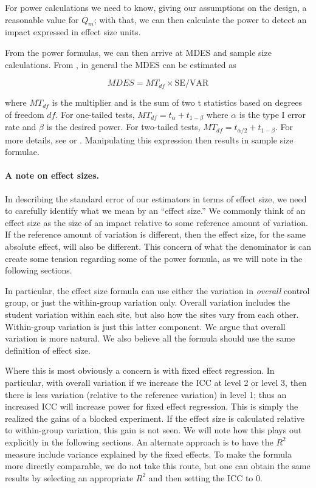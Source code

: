 \documentclass[12pt]{article}
\begin{document}
For power calculations we need to know, giving our assumptions on the design, a reasonable value for $Q_m$; with that, we can then calculate the power to detect an impact expressed in effect size units.

From the power formulas, we can then arrive at MDES and sample size calculations.
From \citet{Dong2013}, in general the MDES can be estimated as

$$ MDES = MT_{df} \times \text{SE} / \text{VAR} $$

where $MT_{df}$ is the multiplier and is the sum of two t statistics based on degrees of freedom $df$.
For one-tailed tests, $MT_{df} = t_{\alpha} + t_{1-\beta}$ where $\alpha$ is the type I error rate and $\beta$ is the desired power.  For two-tailed tests, $MT_{df} = t_{\alpha/2} + t_{1-\beta}$.
For more details, see \citet[page 31]{Dong2013} or \citet[page 22]{Bloom2006}.
Manipulating this expression then results in sample size formulae.


\paragraph{A note on effect sizes.}
In describing the standard error of our estimators in terms of effect size, we need to carefully identify what we mean by an ``effect size.''
We commonly think of an effect size as the size of an impact relative to some reference amount of variation.
If the reference amount of variation is different, then the effect size, for the same absolute effect, will also be different.
This concern of what the denominator is can create some tension regarding some of the power formula, as we will note in the following sections.

In particular, the effect size formula can use either the variation in \emph{overall} control group, or just the within-group variation only.
Overall variation includes the student variation within each site, but also how the sites vary from each other.  Within-group variation is just this latter component.
We argue that overall variation is more natural.
We also believe all the formula should use the same definition of effect size.

Where this is most obviously a concern is with fixed effect regression.
In particular, with overall variation if we increase the ICC at level 2 or level 3, then there is less variation (relative to the reference variation) in level 1; thus an increased ICC will increase power for fixed effect regression.
This is simply the realized the gains of a blocked experiment.
If the effect size is calculated relative to within-group variation, this gain is not seen.
We will note how this plays out explicitly in the following sections.
An alternate approach is to have the $R^2$ measure include variance explained by the fixed effects.
To make the formula more directly comparable, we do not take this route, but one can obtain the same results by selecting an appropriate $R^2$ and then setting the ICC to 0.
\end{document}
